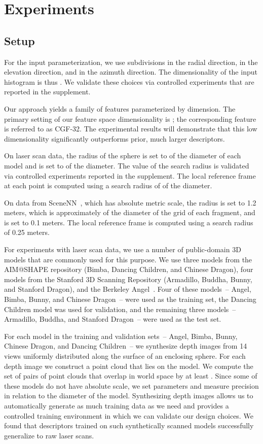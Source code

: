 \section{Experiments}
\label{doc:results}

\subsection{Setup}

For the input parameterization, we use  subdivisions in the radial direction,  in the elevation direction, and  in the azimuth direction. The dimensionality of the input histogram is thus . We validate these choices via controlled experiments that are reported in the supplement.

Our approach yields a family of features parameterized by dimension. The primary setting of our feature space dimensionality is ; the corresponding feature is referred to as \mbox{CGF-32}. The experimental results will demonstrate that this low dimensionality significantly outperforms prior, much larger descriptors.

On laser scan data, the radius  of the sphere  is set to  of the diameter of each model and  is set to  of the diameter. The value of the search radius is validated via controlled experiments reported in the supplement. The local reference frame at each point is computed using a search radius of  of the diameter.

On data from SceneNN~\cite{Scenenn2016}, which has absolute metric scale, the radius  is set to 1.2 meters, which is approximately  of the diameter of the grid of each fragment, and  is set to 0.1 meters. The local reference frame is computed using a search radius of 0.25 meters.

For experiments with laser scan data, we use a number of public-domain 3D models that are commonly used for this purpose. We use three models from the AIM@SHAPE repository (Bimba, Dancing Children, and Chinese Dragon), four models from the Stanford 3D Scanning Repository (Armadillo, Buddha, Bunny, and Stanford Dragon), and the Berkeley Angel~\cite{Kolluri2004}. Four of these models~-- Angel, Bimba, Bunny, and Chinese Dragon~-- were used as the training set, the Dancing Children model was used for validation, and the remaining three models~-- Armadillo, Buddha, and Stanford Dragon~-- were used as the test set.

For each model in the training and validation sets~-- Angel, Bimba, Bunny, Chinese Dragon, and Dancing Children~-- we synthesize depth images from 14 views uniformly distributed along the surface of an enclosing sphere. For each depth image we construct a point cloud that lies on the model. We compute the set of pairs of point clouds  that overlap in world space by at least . Since some of these models do not have absolute scale, we set parameters and measure precision in relation to the diameter of the model. Synthesizing depth images allows us to automatically generate as much training data as we need and provides a controlled training environment in which we can validate our design choices. We found that descriptors trained on such synthetically scanned models successfully generalize to raw laser scans.


